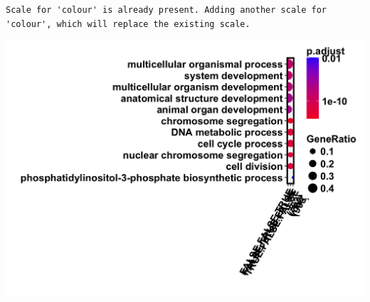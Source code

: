 \documentclass[]{article}
\begin{document}
\begin{verbatim}
Scale for 'colour' is already present. Adding another scale for
'colour', which will replace the existing scale.
\end{verbatim}

\begin{center}\includegraphics{figure/GO_motif_analysis.Rmd/unnamed-chunk-7-1} \end{center}
\end{document}
